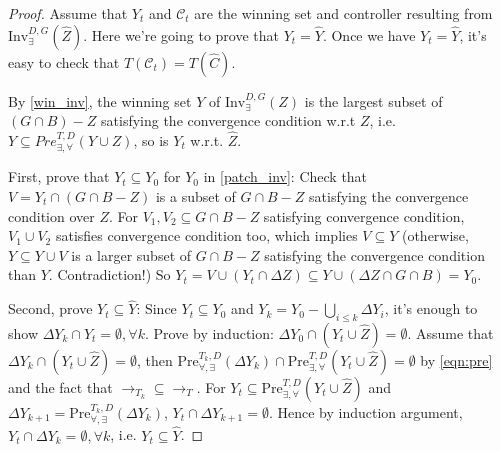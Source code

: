 \begin{proof}
	Assume that $ Y_t $ and $ \mathcal{C}_t $ are the winning set and controller resulting from $ \text{Inv}_{\exists}^{D,G} (\widehat{Z}) $. Here we're going to prove that $ Y_t=\widehat{Y}$. Once we have $ Y_t=\widehat{Y}$, it's easy to check that $ T(\mathcal{C}_t) = T(\widehat{C}) $.
	
	By \eqref{win_inv}, the winning set $ Y $ of $ \text{Inv}_{\exists}^{D,G} (Z) $ is the largest subset of $ (G\cap B) - Z  $ satisfying the convergence condition w.r.t $ Z $, i.e. $ Y \subseteq Pre^{T,D}_{\exists, \forall}(Y\cup Z) $, so is $ Y_t $ w.r.t. $ \widehat{Z} $.
	
	First, prove that $ Y_t \subseteq Y_0 $ for $ Y_0 $ in \eqref{patch_inv}: Check that $ V= Y_t \cap (G\cap B -Z) $ is a subset of $ G\cap B -Z $ satisfying the convergence condition over $ Z $. For $ V_1, V_2 \subseteq G\cap B-Z $ satisfying convergence condition, $ V_1\cup V_2 $ satisfies convergence condition too, which implies $ V \subseteq Y $ (otherwise, $ Y\subseteq Y\cup V $ is a larger subset of $ G\cap B-Z $ satisfying the convergence condition than $ Y $. Contradiction!) So $ Y_t = V\cup (Y_t\cap \Delta Z) \subseteq Y\cup (\Delta Z \cap G\cap B) = Y_0$. 
	
	Second, prove $ Y_t \subseteq \widehat{Y} $: Since $ Y_t\subseteq Y_0 $ and $ Y_k = Y_0 - \bigcup_{i\leq k} \Delta Y_i$, it's enough to show $ \Delta Y_k\cap Y_t = \emptyset,\forall k $. Prove by induction: $ \Delta Y_0\cap (Y_t\cup \widehat{Z}) = \emptyset $. Assume that $ \Delta Y_k \cap (Y_t\cup \widehat{Z}) = \emptyset $, then $\text{Pre}_{\forall, \exists}^{T_k,D}(\Delta Y_k) \cap  \text{Pre}_{\exists,\forall}^{T,D} (Y_t\cup \widehat{Z}) = \emptyset$ by \eqref{eqn:pre} and the fact that $ \rightarrow_{T_k}\subseteq \rightarrow_{T} $. For $ Y_t \subseteq \text{Pre}_{\exists,\forall}^{T,D} (Y_t\cup \widehat{Z}) $ and $ \Delta Y_{k+1} = \text{Pre}_{\forall, \exists}^{T_k,D}(\Delta Y_k) $, $ Y_t\cap \Delta Y_{k+1} = \emptyset $. Hence by induction argument, $ Y_t \cap \Delta Y_k = \emptyset, \forall k $, i.e. $ Y_t\subseteq \widehat{Y} $. 
	

\end{proof}
